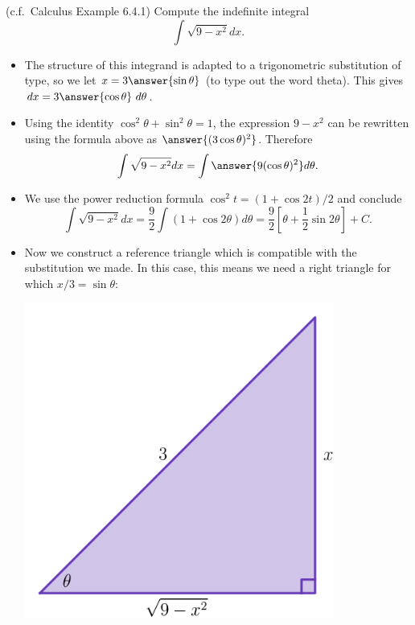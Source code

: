 \documentclass{ximera}
\begin{document}
\begin{example}
(c.f.~Calculus Example 6.4.1) Compute the indefinite integral
\[ \int \sqrt{9 - x^2} dx. \]
\begin{itemize}
\item The structure of this integrand is adapted to a trigonometric substitution of  type, so we let $x = 3 \answer{\sin \theta}$ (to type out the word theta). This gives $dx = 3 \answer{\cos \theta}~d \theta$.
\item Using the identity $\cos^2 \theta + \sin^2 \theta = 1$, the expression $9 - x^2$ can be rewritten using the formula above as $\answer{(3 \cos \theta)^2}$. Therefore
\[ \int \sqrt{9-x^2} dx = \int \answer{9 (\cos \theta)^2} d \theta. \]
\item We use the power reduction formula $\cos^2 t = (1 + \cos 2t)/2$ and conclude
\[ \int \sqrt{9-x^2} dx = \frac{9}{2} \int \left( 1 + \cos 2 \theta \right) d \theta = \frac{9}{2} \left[ \theta + \frac{1}{2} \sin 2 \theta \right] + C. \]
\item Now we construct a reference triangle which is compatible with the substitution we made. In this case, this means we need a right triangle for which $x/3 = \sin \theta$:
\begin{center}
\begin{image}
\includegraphics[width=4in]{images/trigsub01.png}
\end{image}
\end{center}

\end{itemize}
\end{example}

\begin{example}

\end{example}
\end{document}
